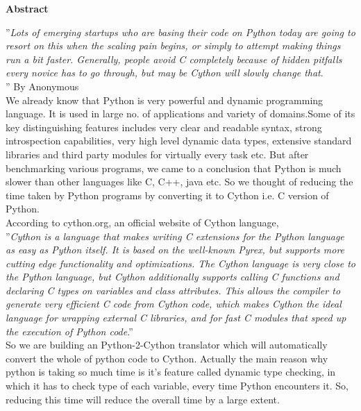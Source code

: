 \vspace*{0.5in}
\begin{center}
\begin{large}
{\bf Abstract}
\end{large}
\end{center}

''{{\textit{Lots of emerging startups who are basing their code on Python today are going to resort on this when the scaling pain begins, or simply to attempt making things run a bit faster. Generally, people avoid C completely because of hidden pitfalls every novice has to go through, but may be Cython will slowly change that}.}}\\''
                                                          By Anonymous \\

We already know that Python is very powerful and dynamic programming language. It is used in large no. of applications and variety of domains.Some of its key distinguishing features includes very clear and readable syntax, strong introspection capabilities, very high level dynamic data types, extensive standard libraries and third party modules for virtually every task etc. But after benchmarking various programs, we came to a conclusion that Python is much slower than other languages like C, C++, java etc. So we thought of reducing the time taken by Python programs by converting it to Cython i.e. C version of Python.\\

According to cython.org, an official website of Cython language, 
\\''{{\textit{Cython is a language that makes writing C extensions for the Python language as easy as Python itself. It is based on the well-known Pyrex, but supports more cutting edge functionality and optimizations. The Cython language is very close to the Python language, but Cython additionally supports calling C functions and declaring C types on variables and class attributes. This allows the compiler to generate very efficient C code from Cython code, which makes Cython the ideal language for wrapping external C libraries, and for fast C modules that speed up the execution of Python code}.}}''\\
	
	So we are building an Python-2-Cython translator which will automatically convert the whole of python code to Cython. Actually the main reason why python is taking so much time is it's feature called dynamic type checking, in which it has to check type of each variable, every time Python encounters it. So, reducing this time will reduce the overall time by a large extent.\\
\pagebreak

